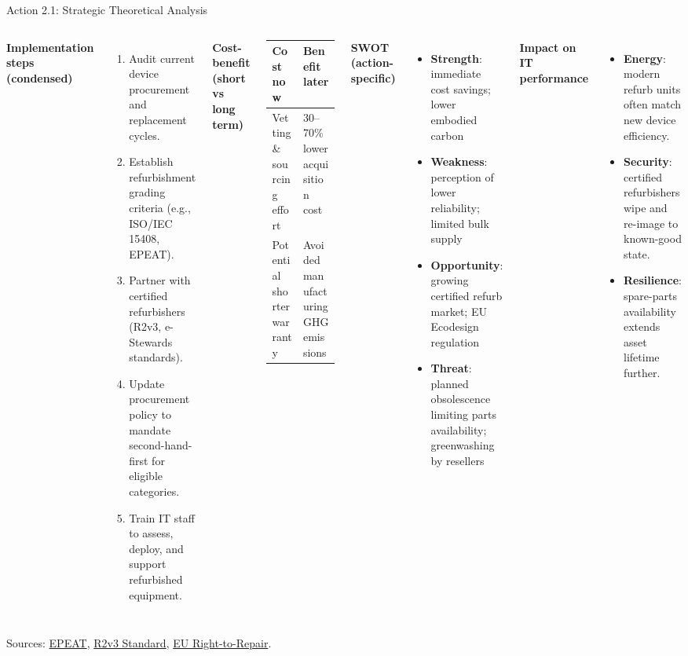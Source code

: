 \documentclass[aspectratio=169]{beamer}
\begin{document}

\begin{frame}{Action 2.1: Strategic Theoretical Analysis}
\scriptsize
\begin{columns}[T,totalwidth=\textwidth]
\textbf{Implementation steps (condensed)}
\begin{enumerate}
  \item Audit current device procurement and replacement cycles.
  \item Establish refurbishment grading criteria (e.g., ISO/IEC 15408, EPEAT).
  \item Partner with certified refurbishers (R2v3, e-Stewards standards).
  \item Update procurement policy to mandate second-hand-first for eligible categories.
  \item Train IT staff to assess, deploy, and support refurbished equipment.
\end{enumerate}

\textbf{Cost-benefit (short vs long term)}
\begin{tabular}{p{1.9cm}p{2.6cm}}
\toprule
Cost now & Benefit later \\
\midrule
Vetting \& sourcing effort & 30--70\% lower acquisition cost \\
Potential shorter warranty & Avoided manufacturing GHG emissions \\
\bottomrule
\end{tabular}

\textbf{SWOT (action-specific)}
\begin{itemize}
  \item \textbf{Strength}: immediate cost savings; lower embodied carbon
  \item \textbf{Weakness}: perception of lower reliability; limited bulk supply
  \item \textbf{Opportunity}: growing certified refurb market; EU Ecodesign regulation
  \item \textbf{Threat}: planned obsolescence limiting parts availability; greenwashing by resellers
\end{itemize}

\textbf{Impact on IT performance}
\begin{itemize}
  \item \textbf{Energy}: modern refurb units often match new device efficiency.
  \item \textbf{Security}: certified refurbishers wipe and re-image to known-good state.
  \item \textbf{Resilience}: spare-parts availability extends asset lifetime further.
\end{itemize}
\end{columns}
\vspace{0.1cm}
\tiny Sources: \href{https://www.epeat.net}{EPEAT}, \href{https://sustainableelectronics.org/r2-standard/}{R2v3 Standard}, \href{https://commission.europa.eu/law/law-topic/consumer-protection-law/directive-repair-goods_en}{EU Right-to-Repair}.
\end{frame}
\end{document}
